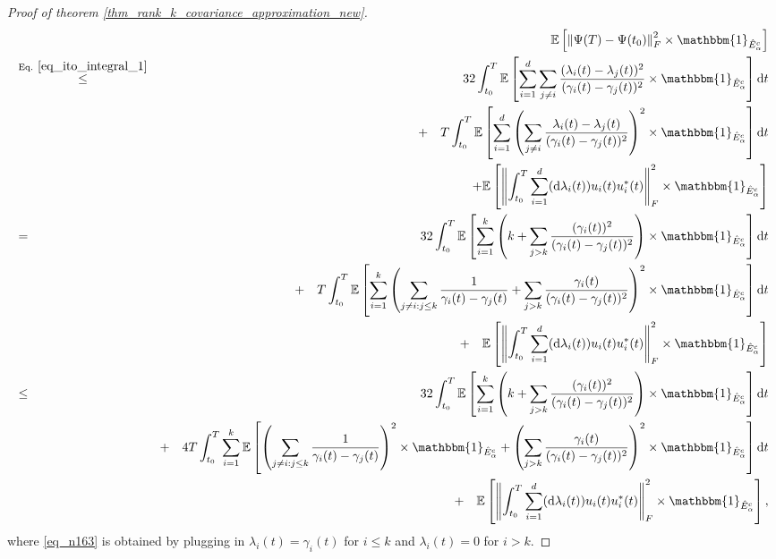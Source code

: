 \documentclass[11pt,letterpaper]{article}
\begin{document}
\begin{proof}[Proof of theorem \ref{thm_rank_k_covariance_approximation_new}]
 \begin{eqnarray}
& &\!\!\!\!\!\!\!\!\! \! \!\! \! \!\!\!\!\!\!\!\!\!\!\!\!\!\!\!\! \! \! \mathbb{E}\left[\left\|\Psi (T) -  \Psi(t_0)\right \|_F^2 \times \mathbbm{1}_{\hat{E}_\alpha^c}\right] \nonumber\\
%
&\stackrel{\textrm{Eq. } \eqref{eq_ito_integral_1}}{\leq}& 32\int_{t_0}^{T}   \mathbb{E}\left[ \sum_{i=1}^{d}  \sum_{j \neq i}  \frac{(\lambda_i(t) - \lambda_j(t))^2}{(\gamma_i(t)- \gamma_j(t))^2} \times \mathbbm{1}_{\hat{E}_\alpha^c}\right]\mathrm{d}t \nonumber \\
    & &  + \quad     T \int_{t_0}^{T}\mathbb{E}\left[\sum_{i=1}^{d}\left(\sum_{j\neq i} \frac{\lambda_i(t) - \lambda_j(t)}{(\gamma_i(t)- \gamma_j(t))^2}\right)^2 \times \mathbbm{1}_{\hat{E}_\alpha^c}\right] \mathrm{d}t \nonumber\\
    & &  + \mathbb{E}\left[\left\|\int_{t_0}^T \sum_{i=1}^d (\mathrm{d} \lambda_i(t))  u_i(t) u_i^\ast(t)\right\|_F^2  \times \mathbbm{1}_{\hat{E}_\alpha^c}\right] \nonumber\\
&=&  32\int_{t_0}^{T}   \mathbb{E}\left[ \sum_{i=1}^{k} \left( k +  \sum_{j >k}  \frac{(\gamma_i(t))^2}{(\gamma_i(t)- \gamma_j(t))^2} \right)  \times \mathbbm{1}_{\hat{E}_\alpha^c}\right]\mathrm{d}t \nonumber \\
    & & + \quad     T \int_{t_0}^{T}\mathbb{E}\left[\sum_{i=1}^{k}\left(\sum_{j \neq i: j\leq k} \frac{1}{\gamma_i(t)- \gamma_j(t)} + \sum_{j> k} \frac{\gamma_i(t)}{(\gamma_i(t)- \gamma_j(t))^2}\right)^2  \times \mathbbm{1}_{\hat{E}_\alpha^c}\right] \mathrm{d}t \nonumber\\
    & & + \quad  \mathbb{E}\left[\left\|\int_{t_0}^T \sum_{i=1}^d (\mathrm{d} \lambda_i(t))  u_i(t) u_i^\ast(t)\right\|_F^2  \times \mathbbm{1}_{\hat{E}_\alpha^c}\right]   \label{eq_n163}\\
    &\leq &  32\int_{t_0}^{T}   \mathbb{E}\left[ \sum_{i=1}^{k} \left( k +  \sum_{j >k}  \frac{(\gamma_i(t))^2}{(\gamma_i(t)- \gamma_j(t))^2} \right)  \times \mathbbm{1}_{\hat{E}_\alpha^c}\right]\mathrm{d}t \nonumber \\
    & &  + \quad    4T \int_{t_0}^{T}\sum_{i=1}^{k}\mathbb{E}\left[\left(\sum_{j \neq i: j\leq k} \frac{1}{\gamma_i(t)- \gamma_j(t)}\right)^2  \times \mathbbm{1}_{\hat{E}_\alpha^c} +  \left(\sum_{j> k} \frac{\gamma_i(t)}{(\gamma_i(t)- \gamma_j(t))^2}\right)^2  \times \mathbbm{1}_{\hat{E}_\alpha^c}\right] \mathrm{d}t\nonumber\\
    & & + \quad  \mathbb{E}\left[\left\|\int_{t_0}^T \sum_{i=1}^d (\mathrm{d} \lambda_i(t))  u_i(t) u_i^\ast(t)\right\|_F^2  \times \mathbbm{1}_{\hat{E}_\alpha^c}\right], \label{eq_u1}
\end{eqnarray}
%
where \eqref{eq_n163} is obtained by plugging in  $\lambda_i(t) = \gamma_i(t)$ for $i \leq k$ and $\lambda_i(t) = 0$  for $i>k$.



\end{proof}
\end{document}
